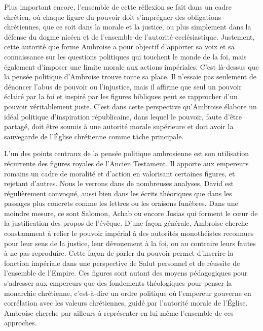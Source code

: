 \bigskip

Plus important encore, l'ensemble de cette réflexion se fait dans un cadre chrétien, où chaque figure du pouvoir doit s'imprégner des obligations chrétiennes, que ce soit dans la morale et la justice, ou plus simplement dans la défense du dogme nicéen et de l'ensemble de l'autorité ecclésiastique. Justement, cette autorité que forme Ambroise a pour objectif d'apporter sa voix et sa connaissance sur les questions politiques qui touchent le monde de la foi, mais également d'imposer une limite morale aux actions impériales. C'est là-dessus que la pensée politique d'Ambroise trouve toute sa place. Il n'essaie pas seulement de dénoncer l'abus de pouvoir ou l'injustice, mais il affirme que seul un pouvoir éclairé par la foi et inspiré par les figures bibliques peut se rapprocher d’un pouvoir véritablement juste. C’est dans cette perspective qu’Ambroise élabore un idéal politique d’inspiration républicaine, dans lequel le pouvoir, faute d’être partagé, doit être soumis à une autorité morale supérieure et doit avoir la sauvegarde de l’Église chrétienne comme tâche principale.

\bigskip

L'un des points centraux de la pensée politique ambrosienne est son utilisation récurrente des figures royales de l'Ancien Testament. Il apporte aux empereurs romains un cadre de moralité et d'action en valorisant certaines figures, et rejetant d'autres. Nous le verrons dans de nombreuses analyses, David est régulièrement convoqué, aussi bien dans les écrits théoriques que dans les passages plus concrets comme les lettres ou les oraisons funèbres. Dans une moindre mesure, ce sont Salomon, Achab ou encore Josias qui forment le cœur de la justification des propos de l'évêque. D'une façon générale, Ambroise cherche constamment à relier le pouvoir impérial à des autorités monothéistes reconnues pour leur sens de la justice, leur dévouement à la foi, ou au contraire leurs fautes à ne pas reproduire. Cette façon de parler du pouvoir permet d'inscrire la fonction impériale dans une perspective de Salut personnel et de réussite de l'ensemble de l'Empire. Ces figures sont autant des moyens pédagogiques pour s’adresser aux empereurs que des fondements théologiques pour penser la monarchie chrétienne, c’est-à-dire un ordre politique où l’empereur gouverne en corrélation avec les valeurs chrétiennes, guidé par l’autorité morale de l’Église. Ambroise cherche par ailleurs à représenter en lui-même l'ensemble de ces approches.

